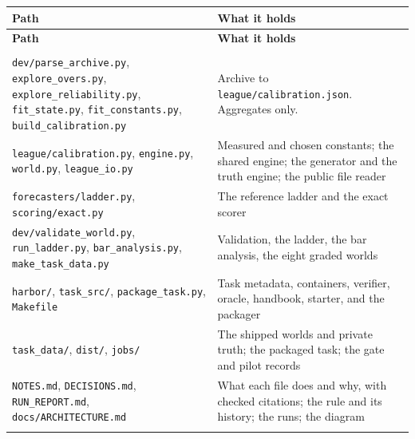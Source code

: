 \documentclass[11pt,letterpaper]{article}
\begin{document}
\begin{small}
\begin{longtable}{>{\raggedright\arraybackslash}p{}>{\raggedright\arraybackslash}p{}}
\toprule
\textbf{Path} & \textbf{What it holds} \\ \midrule
\endfirsthead
\toprule
\textbf{Path} & \textbf{What it holds} \\ \midrule
\endhead
\midrule \multicolumn{2}{r}{\footnotesize continued on the next page} \\ \endfoot
\bottomrule \endlastfoot
\texttt{dev/parse\_archive.py}, \texttt{explore\_overs.py}, \texttt{explore\_reliability.py}, \texttt{fit\_state.py}, \texttt{fit\_constants.py}, \texttt{build\_calibration.py} & Archive to \texttt{league/calibration.json}. Aggregates only. \\ \addlinespace[2pt]
\texttt{league/calibration.py}, \texttt{engine.py}, \texttt{world.py}, \texttt{league\_io.py} & Measured and chosen constants; the shared engine; the generator and the truth engine; the public file reader \\ \addlinespace[2pt]
\texttt{forecasters/ladder.py}, \texttt{scoring/exact.py} & The reference ladder and the exact scorer \\ \addlinespace[2pt]
\texttt{dev/validate\_world.py}, \texttt{run\_ladder.py}, \texttt{bar\_analysis.py}, \texttt{make\_task\_data.py} & Validation, the ladder, the bar analysis, the eight graded worlds \\ \addlinespace[2pt]
\texttt{harbor/}, \texttt{task\_src/}, \texttt{package\_task.py}, \texttt{Makefile} & Task metadata, containers, verifier, oracle, handbook, starter, and the packager \\ \addlinespace[2pt]
\texttt{task\_data/}, \texttt{dist/}, \texttt{jobs/} & The shipped worlds and private truth; the packaged task; the gate and pilot records \\ \addlinespace[2pt]
\texttt{NOTES.md}, \texttt{DECISIONS.md}, \texttt{RUN\_REPORT.md}, \texttt{docs/ARCHITECTURE.md} & What each file does and why, with checked citations; the rule and its history; the runs; the diagram \\ \addlinespace[2pt]
\end{longtable}
\end{small}
\end{document}
